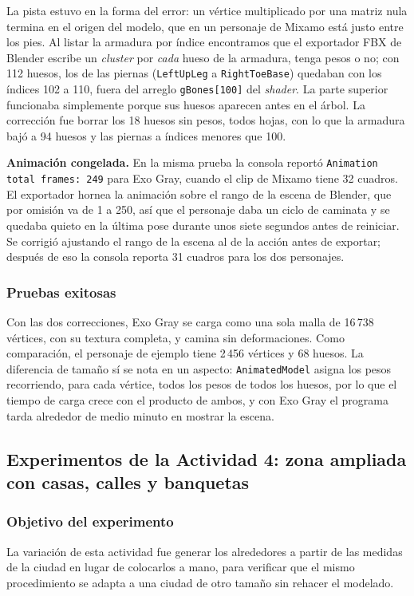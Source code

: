 La pista estuvo en la forma del error: un vértice multiplicado por una matriz nula termina en el origen del modelo, que en un personaje de Mixamo está justo entre los pies. Al listar la armadura por índice encontramos que el exportador FBX de Blender escribe un \textit{cluster} por \emph{cada} hueso de la armadura, tenga pesos o no; con 112 huesos, los de las piernas (\texttt{LeftUpLeg} a \texttt{RightToeBase}) quedaban con los índices 102 a 110, fuera del arreglo \texttt{gBones[100]} del \textit{shader}. La parte superior funcionaba simplemente porque sus huesos aparecen antes en el árbol. La corrección fue borrar los 18 huesos sin pesos, todos hojas, con lo que la armadura bajó a 94 huesos y las piernas a índices menores que 100.

\textbf{Animación congelada.} En la misma prueba la consola reportó \texttt{Animation total frames: 249} para Exo Gray, cuando el clip de Mixamo tiene 32 cuadros. El exportador hornea la animación sobre el rango de la escena de Blender, que por omisión va de 1 a 250, así que el personaje daba un ciclo de caminata y se quedaba quieto en la última pose durante unos siete segundos antes de reiniciar. Se corrigió ajustando el rango de la escena al de la acción antes de exportar; después de eso la consola reporta 31 cuadros para los dos personajes.

\subsubsection{Pruebas exitosas}
Con las dos correcciones, Exo Gray se carga como una sola malla de 16\,738 vértices, con su textura completa, y camina sin deformaciones. Como comparación, el personaje de ejemplo tiene 2\,456 vértices y 68 huesos. La diferencia de tamaño sí se nota en un aspecto: \texttt{AnimatedModel} asigna los pesos recorriendo, para cada vértice, todos los pesos de todos los huesos, por lo que el tiempo de carga crece con el producto de ambos, y con Exo Gray el programa tarda alrededor de medio minuto en mostrar la escena.

\subsection{Experimentos de la Actividad 4: zona ampliada con casas, calles y banquetas}

\subsubsection{Objetivo del experimento}
La variación de esta actividad fue generar los alrededores a partir de las medidas de la ciudad en lugar de colocarlos a mano, para verificar que el mismo procedimiento se adapta a una ciudad de otro tamaño sin rehacer el modelado.

